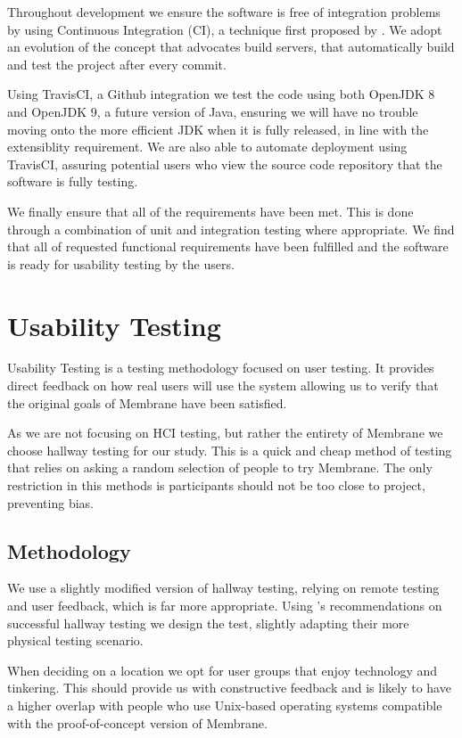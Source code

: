 \documentclass[11pt, a4paper, twoside]{report}
\begin{document}
Throughout development we ensure the software is free of integration problems by using Continuous Integration (CI), a technique first proposed by \cite{booch1991object}. We adopt an evolution of the concept that advocates build servers, that automatically build and test the project after every commit. 

Using TravisCI, a Github integration we test the code using both OpenJDK 8 and OpenJDK 9, a future version of Java, ensuring we will have no trouble moving onto the more efficient JDK when it is fully released, in line with the extensiblity requirement. We are also able to automate deployment using TravisCI, assuring potential users who view the source code repository that the software is fully testing.

We finally ensure that all of the requirements have been met. This is done through a combination of unit and integration testing where appropriate. We find that all of requested functional requirements have been fulfilled and the software is ready for usability testing by the users.

\section{Usability Testing}

Usability Testing is a testing methodology focused on user testing. It provides direct feedback on how real users will use the system \citep{nielsen1994usability} allowing us to verify that the original goals of Membrane have been satisfied.

As we are not focusing on HCI testing, but rather the entirety of Membrane we choose hallway testing for our study. This is a quick and cheap method of testing that relies on asking a random selection of people to try Membrane. The only restriction in this methods is participants should not be too close to project, preventing bias.

\subsection{Methodology}

We use a slightly modified version of hallway testing, relying on remote testing and user feedback, which is far more appropriate. Using \cite{usajobs2014hallway}'s recommendations on successful hallway testing we design the test, slightly adapting their more physical testing scenario.

When deciding on a location we opt for user groups that enjoy technology and tinkering. This should provide us with constructive feedback and is likely to have a higher overlap with people who use Unix-based operating systems compatible with the proof-of-concept version of Membrane.
\end{document}

